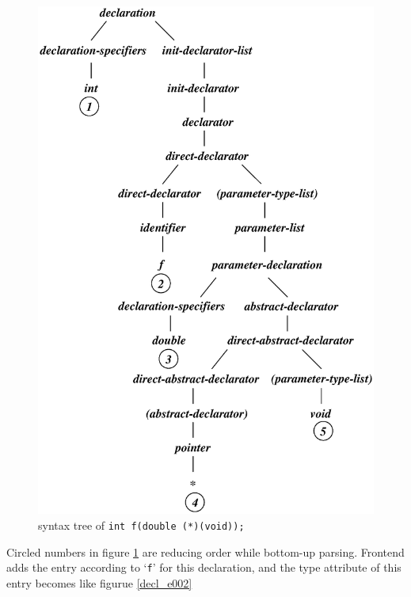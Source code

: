 \begin{figure}[htbp]
\begin{center}
\begin{htmlonly}
\end{htmlonly}
\begin{latexonly}
\includegraphics[width=1.0125\linewidth,height=1.4175\linewidth]{decl001.eps}
\end{latexonly}
\caption{syntax tree of {\tt{int f(double (*)(void));}}}
\label{decl_e001}
\end{center}
\end{figure}
Circled numbers in figure \ref{decl_e001} are reducing order
while bottom-up parsing. Frontend adds the entry according to `{\tt{f}}'
for this declaration, and the type attribute of this entry becomes
like figurue \ref{decl_e002}

